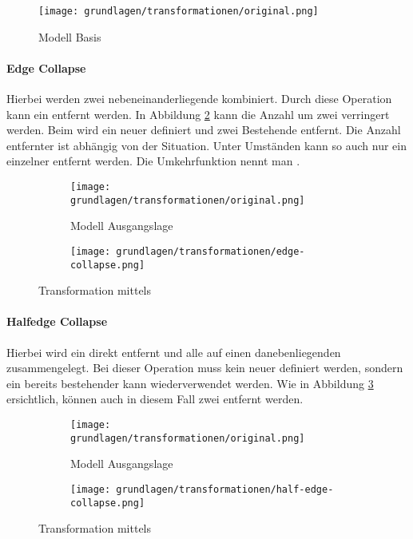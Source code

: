 \begin{figure}[H]
  \centering
  \texttt{[image: grundlagen/transformationen/original.png]}
  \caption{Modell Basis}
  \label{fig:transformationOriginal}
\end{figure}

\paragraph{Edge Collapse}
Hierbei werden zwei nebeneinanderliegende  kombiniert. Durch diese Operation kann ein  entfernt werden. In Abbildung \ref{fig:transformationEdgeCollapse} kann die Anzahl  um zwei verringert werden. Beim  wird ein neuer  definiert und zwei Bestehende entfernt. Die Anzahl entfernter  ist abhängig von der Situation. Unter Umständen kann so auch nur ein einzelner  entfernt werden.
Die Umkehrfunktion nennt man .

\begin{figure}[H]
  \centering
  \begin{subfigure}{.5\textwidth}
    \centering
    \texttt{[image: grundlagen/transformationen/original.png]}
    \caption{Modell Ausgangslage}
  \end{subfigure}%
  \begin{subfigure}{.5\textwidth}
    \centering
    \texttt{[image: grundlagen/transformationen/edge-collapse.png]}
    \caption{}
  \end{subfigure}
  \caption{Transformation mittels }
  \label{fig:transformationEdgeCollapse}
\end{figure}

\paragraph{Halfedge Collapse}
Hierbei wird ein  direkt entfernt und alle  auf einen danebenliegenden  zusammengelegt. Bei dieser Operation muss kein neuer  definiert werden, sondern ein bereits bestehender  kann wiederverwendet werden. Wie in Abbildung \ref{fig:transformationHalfedgeCollapse} ersichtlich, können auch in diesem Fall zwei  entfernt werden.

\begin{figure}[H]
  \centering
  \begin{subfigure}{.5\textwidth}
    \centering
    \texttt{[image: grundlagen/transformationen/original.png]}
    \caption{Modell Ausgangslage}
  \end{subfigure}%
  \begin{subfigure}{.5\textwidth}
    \centering
    \texttt{[image: grundlagen/transformationen/half-edge-collapse.png]}
    \caption{}
  \end{subfigure}
  \caption{Transformation mittels }
  \label{fig:transformationHalfedgeCollapse}
\end{figure}

